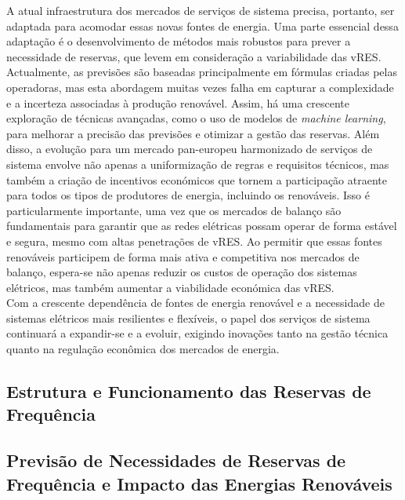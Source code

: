A atual infraestrutura dos mercados de serviços de sistema precisa, portanto, ser adaptada para acomodar essas novas fontes de energia. Uma parte essencial dessa adaptação é o desenvolvimento de métodos mais robustos para prever a necessidade de reservas, que levem em consideração a variabilidade das \gls{vRES}. Actualmente, as previsões são baseadas principalmente em fórmulas criadas pelas operadoras, mas esta abordagem muitas vezes falha em capturar a complexidade e a incerteza associadas à produção renovável. Assim, há uma crescente exploração de técnicas avançadas, como o uso de modelos de \textit{machine learning}, para melhorar a precisão das previsões e otimizar a gestão das reservas.
Além disso, a evolução para um mercado pan-europeu harmonizado de serviços de sistema envolve não apenas a uniformização de regras e requisitos técnicos, mas também a criação de incentivos económicos que tornem a participação atraente para todos os tipos de produtores de energia, incluindo os renováveis. Isso é particularmente importante, uma vez que os mercados de balanço são fundamentais para garantir que as redes elétricas possam operar de forma estável e segura, mesmo com altas penetrações de \gls{vRES}. Ao permitir que essas fontes renováveis participem de forma mais ativa e competitiva nos mercados de balanço, espera-se não apenas reduzir os custos de operação dos sistemas elétricos, mas também aumentar a viabilidade económica das \gls{vRES}.\\
Com a crescente dependência de fontes de energia renovável e a necessidade de sistemas elétricos mais resilientes e flexíveis, o papel dos serviços de sistema continuará a expandir-se e a evoluir, exigindo inovações tanto na gestão técnica quanto na regulação econômica dos mercados de energia.\\


\subsection{Estrutura e Funcionamento das Reservas de Frequência \label{se:reservas_freq}}


\subsection{Previsão de Necessidades de Reservas de Frequência e Impacto das Energias Renováveis \label{se:pred_impact_vres}}





\thispagestyle{plain}
